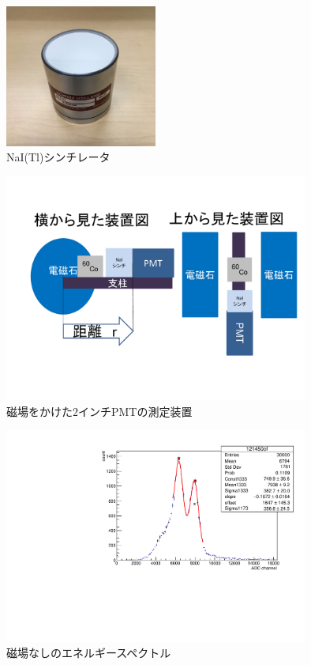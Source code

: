 \begin{figure}[tbp]
	\centering
	\includegraphics[width=5cm]{fig/iguchi/NaIscinti.jpg}
	\caption{NaI(Tl)シンチレータ}
	\label{NaIscinti}
\end{figure}

\begin{figure}[tbp]
	\centering
	\includegraphics[width=10cm]{fig/iguchi/souchizu1.pdf}
	\caption{磁場をかけた2インチPMTの測定装置}
	\label{souchizu1}
\end{figure}

\begin{figure}[tbp]
	\centering
	\includegraphics[angle=-90,width=10cm]{fig/iguchi/121450of.pdf}
	\caption{磁場なしのエネルギースペクトル}
	\label{histoff}
\end{figure}

